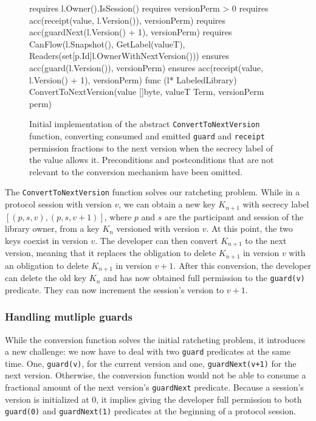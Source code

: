 \begin{figure}
    \begin{gobra}
requires l.Owner().IsSession()
requires versionPerm > 0
requires acc(receipt(value, l.Version()), versionPerm)
requires acc(guardNext(l.Version() + 1), versionPerm)
requires CanFlow(l.Snapshot(), GetLabel(valueT),
    Readers(set[p.Id]{l.OwnerWithNextVersion()}))
ensures  acc(guard(l.Version()), versionPerm)
ensures  acc(receipt(value, l.Version() + 1), versionPerm)
func (l* LabeledLibrary) ConvertToNextVersion(value []byte,
    valueT Term, versionPerm perm)
    \end{gobra}
    \caption{Initial implementation of the abstract \texttt{ConvertToNextVersion} function, converting consumed and emitted \texttt{guard} and \texttt{receipt} permission fractions to the next version when the secrecy label of the value allows it. Preconditions and postconditions that are not relevant to the conversion mechanism have been omitted.}
    \label{lst:convert-to-next-version}
\end{figure}

The \texttt{ConvertToNextVersion} function solves our ratcheting problem. While in a protocol session with version $v$, we can obtain a new key $K_{n+1}$ with secrecy label $[(p,s,v), (p,s,v+1)]$, where $p$ and $s$ are the participant and session of the library owner, from a key $K_n$ versioned with version $v$. At this point, the two keys coexist in version $v$.
The developer can then convert $K_{n+1}$ to the next version, meaning that it replaces the obligation to delete $K_{n+1}$ in version $v$ with an obligation to delete $K_{n+1}$ in version $v+1$.
After this conversion, the developer can delete the old key $K_n$ and has now obtained full permission to the \texttt{guard(v)} predicate. They can now increment the session's version to $v+1$.

\subsubsection{Handling mutliple guards}
\label{sec:handling-mutliple-guards}

While the conversion function solves the initial ratcheting problem, it introduces a new challenge: we now have to deal with two \texttt{guard} predicates at the same time. One, \texttt{guard(v)}, for the current version and one, \texttt{guardNext(v+1)} for the next version.
Otherwise, the conversion function would not be able to consume a fractional amount of the next version's \texttt{guardNext} predicate.
Because a session's version is initialized at $0$, it implies giving the developer full permission to both \texttt{guard(0)} and \texttt{guardNext(1)} predicates at the beginning of a protocol session.

